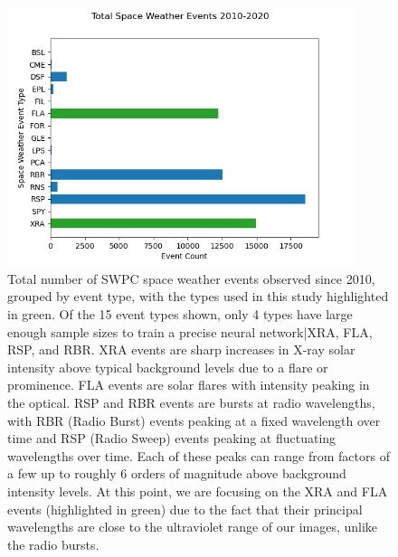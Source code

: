 \documentclass[12pt, letterpaper]{article}
\begin{document}
\begin{figure}[htb!]
    \includegraphics[width=0.9\textwidth]{figures/counts.png}
    \centering
    \caption{Total number of SWPC space weather events observed since 2010, grouped by event type, with the types used in this study highlighted in green. Of the 15 event types shown, only 4 types have large enough sample sizes to train a precise neural network|XRA, FLA, RSP, and RBR. XRA events are sharp increases in X-ray solar intensity above typical background levels due to a flare or prominence. FLA events are solar flares with intensity peaking in the optical. RSP and RBR events are bursts at radio wavelengths, with RBR (Radio Burst) events peaking at a fixed wavelength over time and RSP (Radio Sweep) events peaking at fluctuating wavelengths over time. Each of these peaks can range from factors of a few up to roughly 6 orders of magnitude above background intensity levels. At this point, we are focusing on the XRA and FLA events (highlighted in green) due to the fact that their principal wavelengths are close to the ultraviolet range of our images, unlike the radio bursts.}
    \label{swe_freq}
\end{figure}
\end{document}
